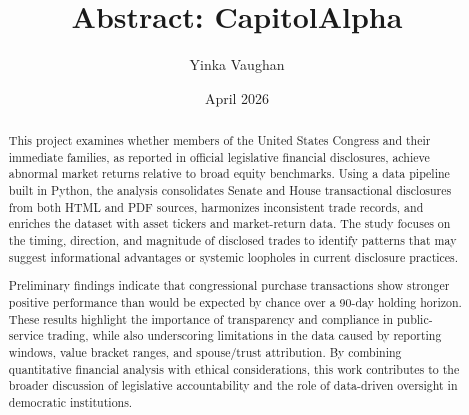 \documentclass[12pt]{article}
\title{Abstract: CapitolAlpha}
\author{Yinka Vaughan}
\date{April 2026}
\begin{document}
\maketitle
\begin{abstract}
This project examines whether members of the United States Congress and their immediate families, as reported in official legislative financial disclosures, achieve abnormal market returns relative to broad equity benchmarks. Using a data pipeline built in Python, the analysis consolidates Senate and House transactional disclosures from both HTML and PDF sources, harmonizes inconsistent trade records, and enriches the dataset with asset tickers and market-return data. The study focuses on the timing, direction, and magnitude of disclosed trades to identify patterns that may suggest informational advantages or systemic loopholes in current disclosure practices.

Preliminary findings indicate that congressional purchase transactions show stronger positive performance than would be expected by chance over a 90-day holding horizon. These results highlight the importance of transparency and compliance in public-service trading, while also underscoring limitations in the data caused by reporting windows, value bracket ranges, and spouse/trust attribution. By combining quantitative financial analysis with ethical considerations, this work contributes to the broader discussion of legislative accountability and the role of data-driven oversight in democratic institutions.
\end{abstract}
\end{document}
